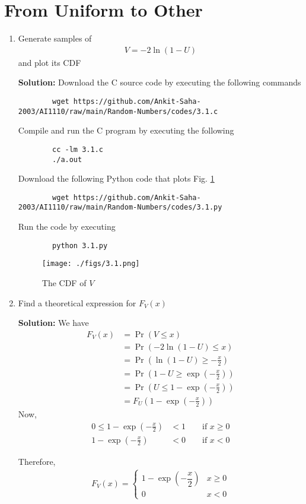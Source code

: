 \documentclass[journal,12pt,twocolumn]{IEEEtran}
\newcommand{\solution}{\noindent \textbf{Solution: }}
\providecommand{\pr}[1]{\ensuremath{\Pr\left(#1\right)}}
\providecommand{\brak}[1]{\ensuremath{\left(#1\right)}}
\numberwithin{equation}{section}
\renewcommand\thesection{\arabic{section}}
\begin{document}
	\section{From Uniform to Other}
	\begin{enumerate}[label=\thesection.\arabic*,ref=\thesection.\theenumi]
	\item Generate samples of 
	\begin{align}
		V = -2\ln\brak{1-U}
	\end{align}
	and plot its CDF
	
	\solution Download the C source code by executing the following commands
	\begin{lstlisting}
		wget https://github.com/Ankit-Saha-2003/AI1110/raw/main/Random-Numbers/codes/3.1.c
	\end{lstlisting}
	Compile and run the C program by executing the following
	\begin{lstlisting}
		cc -lm 3.1.c
		./a.out
	\end{lstlisting}
	Download the following Python code that plots Fig. \ref{fig-3.1}
	\begin{lstlisting}
		wget https://github.com/Ankit-Saha-2003/AI1110/raw/main/Random-Numbers/codes/3.1.py
	\end{lstlisting}
	Run the code by executing
	\begin{lstlisting}
		python 3.1.py
	\end{lstlisting}
	\begin{figure}
		\centering
		\texttt{[image: ./figs/3.1.png]}
		\caption{The CDF of $V$}
		\label{fig-3.1}
	\end{figure}	
	
	\item Find a theoretical expression for $F_V(x)$
	
	\solution We have
	\begin{align}
		F_V(x) &= \pr{V \le x} \\
		&= \pr{-2\ln\brak{1-U} \le x} \\
		&= \pr{\ln\brak{1-U} \ge -\frac{x}{2}} \\
		&= \pr{1-U \ge \exp\brak{-\frac{x}{2}}} \\
		&= \pr{U \le 1 - \exp\brak{-\frac{x}{2}}} \\
		&= F_U\brak{1 - \exp\brak{-\frac{x}{2}}}
	\end{align}
	Now,
	\begin{align}
		0 \le 1-\exp\brak{-\frac{x}{2}} &< 1 \qquad \text{if } x \ge 0	\\	
		1-\exp\brak{-\frac{x}{2}} &< 0 \qquad \text{if } x < 0	
	\end{align}
	
	Therefore,
	\begin{align}
		F_V(x) = 
		\begin{cases}
			1-\exp\brak{-\dfrac{x}{2}} & x \ge 0 \\
			0 & x < 0
		\end{cases}
	\end{align}
	
	\end{enumerate}
	
\end{document}
